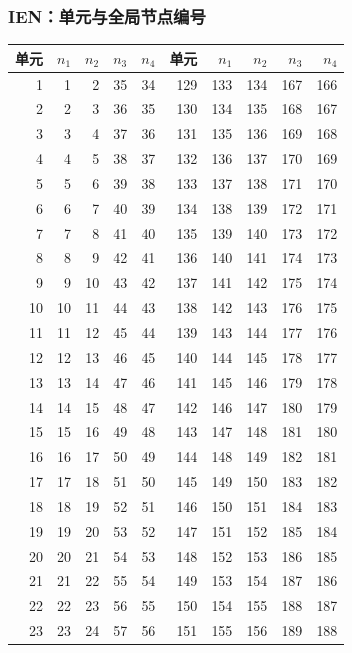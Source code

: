 \subsubsection*{IEN：单元与全局节点编号}
\small\begin{longtable}{rrrrr@{\qquad}rrrrr}
\toprule 单元 & $n_1$ & $n_2$ & $n_3$ & $n_4$ & 单元 & $n_1$ & $n_2$ & $n_3$ & $n_4$ \\ \midrule\endhead
1 & 1 & 2 & 35 & 34 & 129 & 133 & 134 & 167 & 166 \\
2 & 2 & 3 & 36 & 35 & 130 & 134 & 135 & 168 & 167 \\
3 & 3 & 4 & 37 & 36 & 131 & 135 & 136 & 169 & 168 \\
4 & 4 & 5 & 38 & 37 & 132 & 136 & 137 & 170 & 169 \\
5 & 5 & 6 & 39 & 38 & 133 & 137 & 138 & 171 & 170 \\
6 & 6 & 7 & 40 & 39 & 134 & 138 & 139 & 172 & 171 \\
7 & 7 & 8 & 41 & 40 & 135 & 139 & 140 & 173 & 172 \\
8 & 8 & 9 & 42 & 41 & 136 & 140 & 141 & 174 & 173 \\
9 & 9 & 10 & 43 & 42 & 137 & 141 & 142 & 175 & 174 \\
10 & 10 & 11 & 44 & 43 & 138 & 142 & 143 & 176 & 175 \\
11 & 11 & 12 & 45 & 44 & 139 & 143 & 144 & 177 & 176 \\
12 & 12 & 13 & 46 & 45 & 140 & 144 & 145 & 178 & 177 \\
13 & 13 & 14 & 47 & 46 & 141 & 145 & 146 & 179 & 178 \\
14 & 14 & 15 & 48 & 47 & 142 & 146 & 147 & 180 & 179 \\
15 & 15 & 16 & 49 & 48 & 143 & 147 & 148 & 181 & 180 \\
16 & 16 & 17 & 50 & 49 & 144 & 148 & 149 & 182 & 181 \\
17 & 17 & 18 & 51 & 50 & 145 & 149 & 150 & 183 & 182 \\
18 & 18 & 19 & 52 & 51 & 146 & 150 & 151 & 184 & 183 \\
19 & 19 & 20 & 53 & 52 & 147 & 151 & 152 & 185 & 184 \\
20 & 20 & 21 & 54 & 53 & 148 & 152 & 153 & 186 & 185 \\
21 & 21 & 22 & 55 & 54 & 149 & 153 & 154 & 187 & 186 \\
22 & 22 & 23 & 56 & 55 & 150 & 154 & 155 & 188 & 187 \\
23 & 23 & 24 & 57 & 56 & 151 & 155 & 156 & 189 & 188 \\

\end{longtable}

